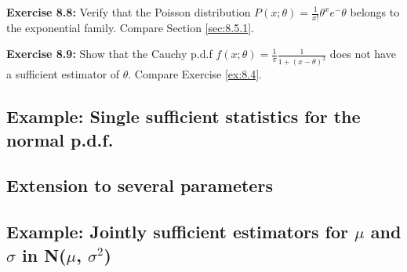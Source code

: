 \documentclass[../main.tex]{subfiles}
\begin{document}
\textbf{Exercise 8.8:}
Verify that the Poisson distribution
$P(x;\theta) = \frac{1}{x!} \theta^x e^-\theta$
belongs to the exponential family.
Compare Section \ref{sec:8.5.1}.

\textbf{Exercise 8.9:}
Show that the Cauchy p.d.f
$f(x;\theta) = \frac{1}{\pi} \frac{1}{1 + (x-\theta)^2}$
does not have a sufficient estimator of $\theta$.
Compare Exercise \ref{ex:8.4}.

\subsection{Example: Single sufficient statistics for the normal p.d.f.}
\subsection{Extension to several parameters}
\subsection{Example: Jointly sufficient estimators for $\mu$ and $\sigma$ in N($\mu$, $\sigma^2$)}
\end{document}
